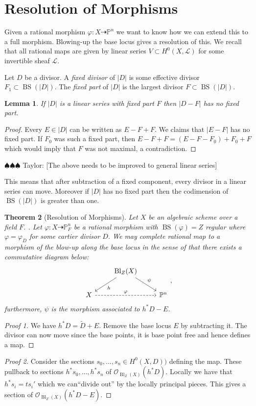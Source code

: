 \documentclass[12pt]{article}
\numberwithin{equation}{section}
\newtheorem{theorem}{Theorem}[subsection]
\newtheorem{lemma}[theorem]{Lemma}
\theoremstyle{definition}
\theoremstyle{remark}
\newcommand{\Ocal}{\mathcal{O}}
\newcommand{\PP}{\mathbb{P}}
\newcommand{\Bl}{\operatorname{Bl}}
\newcommand{\Lcal}{\mathcal{L}}
\newcommand{\BS}{\operatorname{BS}}
\newcommand{\taylor}[1]{{\color{blue} \sf $\spadesuit\spadesuit\spadesuit$ Taylor: [#1]}}
\begin{document}
\section{Resolution of Morphisms}
Given a rational morphism $ \varphi: X \dashrightarrow \PP^n $
we want to know how we can extend this to a full morphism. 
Blowing-up the base locus gives a resolution of this.
We recall that all rational maps are given by linear series $V \subset H^0(X,\Lcal)$ for some invertible sheaf $\Lcal$. 

Let $D$ be a divisor. 
A \emph{fixed divisor} of $\vert D \vert$ is some effective divisor $F_1 \subset \BS(\vert D\vert)$.
The \emph{fixed part} of $\vert D \vert$ is the largest divisor $F \subset \BS(\vert D \vert)$. 

\begin{lemma}
	If $\vert D \vert$ is a linear series with fixed part $F$ then $\vert D-F\vert$ has no fixed part. 
\end{lemma}
\begin{proof}
	Every $E \in \vert D \vert$ can be written as $E-F + F$. 
	We claims that $\vert E-F\vert$ has no fixed part. 
	If $F_0$ was such a fixed part, then $E-F+F=(E-F-F_0)+F_0+F$ which would imply that $F$ was not maximal, a contradiction.
\end{proof}
\taylor{The above needs to be improved to general linear series}

This means that after subtraction of a fixed component, every divisor in a linear series can move.
Moreover if $\vert D\vert$ has no fixed part then the codimension of $\BS(\vert D \vert)$ is greater than one.

\begin{theorem}[Resolution of Morphisms]
	Let $X$ be an algebraic scheme over a field $F$. .
	Let $\varphi: X \dashrightarrow \PP^n_F$ be a rational morphism with $\BS(\varphi)=Z$ regular where $\varphi = \varphi_{D}$ for some cartier divisor $D$. 
	We may complete rational map to a morphism of the blow-up along the base locus in the sense of that there exists a commutative diagram below:
	$$ 
	\begin{tikzcd}
	& \Bl_Z(X) \ar[dr,"\psi"] \ar[dl, "h"] &\\
	X \ar[rr,dashed,"\varphi"] & & \PP^n
	\end{tikzcd},
	$$ 
	furthermore, $\psi$ is the morphism associated to $h^*D-E$.
\end{theorem}
\begin{proof}[Proof 1]
	We have $h^*D = \widetilde{D}+E$.
	Remove the base locus $E$ by subtracting it. 
	The divisor can now move since the base points, it is base point free and hence defines a map.
\end{proof}
\begin{proof}[Proof 2]
	Consider the sections $s_0,\ldots,s_n \in H^0(X,D))$ defining the map. 
	These pullback to sections $h^*s_0,\ldots, h^*s_n$ of $\Ocal_{\Bl_Z(X)}(h^*D)$. 
	Locally we have that $h^*s_i = t s_i'$ which we can``divide out'' by the locally principal pieces.  
	This gives a section of $\Ocal_{\Bl_Z(X)}(h^*D-E)$.
\end{proof}
\end{document}
